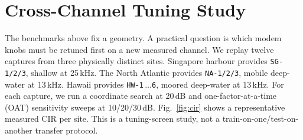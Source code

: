 \documentclass[journal]{IEEEtran}
\newcommand{\junalite}{JUNA-lite}
\newcommand{\junawz}{JUNA-Wz}
\begin{document}
\begin{table}[t]
\centering
\caption{\junawz{} versus \junalite{}: payload-exact PSR across SNR on the
three representative captures. \textbf{Bold} marks a gradient win with disjoint
Wilson 95\% intervals (generated from
\texttt{tex/figure\_data/tab\_grad\_vs\_lite.tex}).}
\label{tab:grad-vs-lite}
\small
\resizebox{\columnwidth}{!}{}
\end{table}

\begin{table}[t]
\centering
\caption{\junawz{} versus \junalite{}: stacked payload-exact PSR summary over all
48 capture--SNR cells in the head-to-head comparison (generated from
\texttt{tex/figure\_data/tab\_grad\_aggregate.tex}).}
\label{tab:grad-aggregate}
\small
\resizebox{\columnwidth}{!}{}
\end{table}

\begin{table}[t]
\centering
\caption{\junawz{} ablation against \junalite{}: payload-exact PSR for the default
soft \texttt{wz\_juna}, a hard-anchor variant, and a forced-final variant, each
against \junalite{}, on representative SG-1/NA-1/HW-1 captures at 5/10\,dB.
PSR follows the same payload-exact, post-selection definition as the main
tables; the final column gives the packet denominator.}
\label{tab:gradient-ablation}
\small
\resizebox{\columnwidth}{!}{}
\end{table}

\section{Cross-Channel Tuning Study}\label{sec:transfer}
The benchmarks above fix a geometry. A practical question is which modem knobs
must be retuned first on a new measured channel. We replay twelve captures from
three physically distinct sites. Singapore harbour provides
\texttt{SG-1/2/3}, shallow at 25\,kHz. The North Atlantic provides
\texttt{NA-1/2/3}, mobile deep-water at 13\,kHz. Hawaii provides
\texttt{HW-1}\,$\dots$\texttt{6}, moored deep-water at 13\,kHz. For each capture,
we run a coordinate search at 20\,dB and one-factor-at-a-time (OAT) sensitivity
sweeps at 10/20/30\,dB. Fig.~\ref{fig:cir}
shows a representative measured CIR per site. This is a tuning-screen study, not
a train-on-one/test-on-another transfer protocol.
\end{document}
